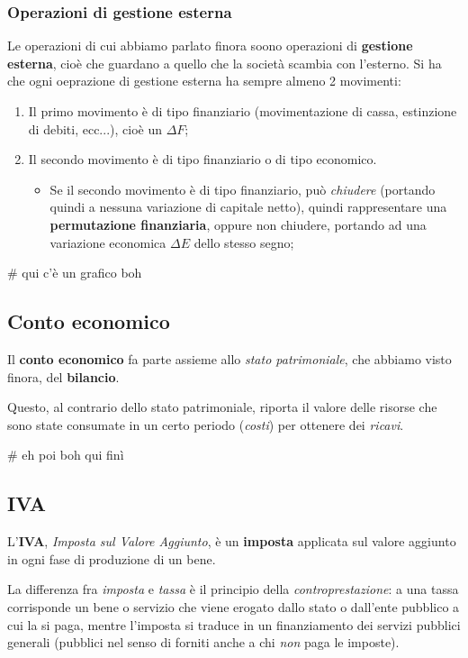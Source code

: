 \documentclass[a4paper,11pt]{article}
\begin{document}
\subsubsection{Operazioni di gestione esterna}
Le operazioni di cui abbiamo parlato finora soono operazioni di \textbf{gestione esterna}, cioè che guardano a quello che la società scambia con l'esterno.
Si ha che ogni oeprazione di gestione esterna ha sempre almeno 2 movimenti:
\begin{enumerate}
	\item Il primo movimento è di tipo finanziario (movimentazione di cassa, estinzione di debiti, ecc...), cioè un $\Delta F$;
	\item Il secondo movimento è di tipo finanziario o di tipo economico.
		\begin{itemize}
			\item Se il secondo movimento è di tipo finanziario, può \textit{chiudere} (portando quindi a nessuna variazione di capitale netto), quindi rappresentare una \textbf{permutazione finanziaria}, oppure non chiudere, portando ad una variazione economica $\Delta E$ dello stesso segno;
		\end{itemize}
\end{enumerate}

# qui c'è un grafico boh

\subsection{Conto economico}
Il \textbf{conto economico} fa parte assieme allo \textit{stato patrimoniale}, che abbiamo visto finora, del \textbf{bilancio}.

Questo, al contrario dello stato patrimoniale, riporta il valore delle risorse che sono state consumate in un certo periodo (\textit{costi}) per ottenere dei \textit{ricavi}.

# eh poi boh qui finì

\subsection{IVA}
L'\textbf{IVA}, \textit{Imposta sul Valore Aggiunto}, è un \textbf{imposta} applicata sul valore aggiunto in ogni fase di produzione di un bene.

\par\smallskip

La differenza fra \textit{imposta} e \textit{tassa} è il principio della \textit{controprestazione}: a una tassa corrisponde un bene o servizio che viene erogato dallo stato o dall'ente pubblico a cui la si paga, mentre l'imposta si traduce in un finanziamento dei servizi pubblici generali (pubblici nel senso di forniti anche a chi \textit{non} paga le imposte). 
\end{document}
